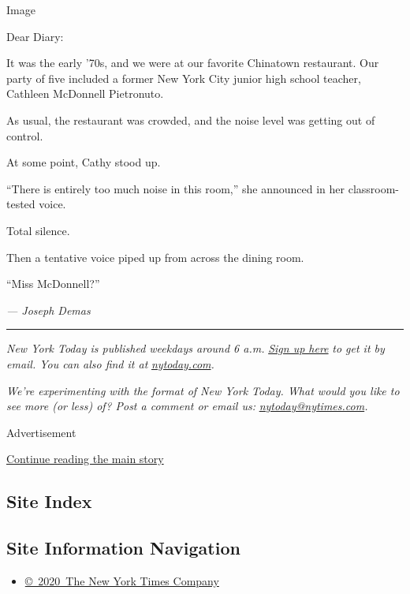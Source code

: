 Image

Dear Diary:

It was the early '70s, and we were at our favorite Chinatown restaurant.
Our party of five included a former New York City junior high school
teacher, Cathleen McDonnell Pietronuto.

As usual, the restaurant was crowded, and the noise level was getting
out of control.

At some point, Cathy stood up.

``There is entirely too much noise in this room,'' she announced in her
classroom-tested voice.

Total silence.

Then a tentative voice piped up from across the dining room.

``Miss McDonnell?''

\emph{--- Joseph Demas}

\begin{center}\rule{0.5\linewidth}{\linethickness}\end{center}

\emph{New York Today is published weekdays around 6 a.m.}
\href{https://www.nytimes.com/newsletters/newyorktoday?module=inline}{\emph{Sign
up here}} \emph{to get it by email. You can also find it at}
\href{http://www.nytoday.com/}{\emph{nytoday.com}}\emph{.}

\emph{We're experimenting with the format of New York Today. What would
you like to see more (or less) of? Post a comment or email us:}
\href{mailto:nytoday@nytimes.com}{\emph{nytoday@nytimes.com}}\emph{.}

Advertisement

\protect\hyperlink{after-bottom}{Continue reading the main story}

\hypertarget{site-index}{%
\subsection{Site Index}\label{site-index}}

\hypertarget{site-information-navigation}{%
\subsection{Site Information
Navigation}\label{site-information-navigation}}

\begin{itemize}
\tightlist
\item
  \href{https://help.nytimes.com/hc/en-us/articles/115014792127-Copyright-notice}{©~2020~The
  New York Times Company}
\end{itemize}

